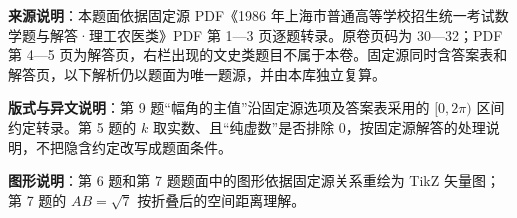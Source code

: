 

\begin{gktip}
\textbf{来源说明}：本题面依据固定源 PDF《1986 年上海市普通高等学校招生统一考试数学题与解答·理工农医类》PDF 第 1—3 页逐题转录。原卷页码为 30—32；PDF 第 4—5 页为解答页，右栏出现的文史类题目不属于本卷。固定源同时含答案表和解答页，以下解析仍以题面为唯一题源，并由本库独立复算。

\textbf{版式与异文说明}：第 9 题“幅角的主值”沿固定源选项及答案表采用的 $[0,2\pi)$ 区间约定转录。第 5 题的 $k$ 取实数、且“纯虚数”是否排除 0，按固定源解答的处理说明，不把隐含约定改写成题面条件。

\textbf{图形说明}：第 6 题和第 7 题题面中的图形依据固定源关系重绘为 TikZ 矢量图；第 7 题的 $AB=\sqrt7$ 按折叠后的空间距离理解。
\end{gktip}

